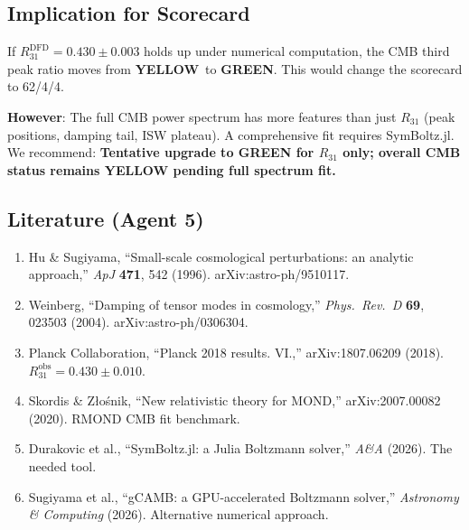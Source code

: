 \documentclass[11pt,a4paper]{article}
\newcommand{\GREEN}{\textcolor{dfdgreen}{\textbf{GREEN}}}
\newcommand{\YELLOW}{\textcolor{dfdyellow}{\textbf{YELLOW}}}
\begin{document}
\subsection{Implication for Scorecard}

If $R_{31}^{\mathrm{DFD}} = 0.430 \pm 0.003$ holds up under numerical computation, the CMB third peak ratio moves from \YELLOW\ to \GREEN. This would change the scorecard to 62/4/4.

\textbf{However}: The full CMB power spectrum has more features than just $R_{31}$ (peak positions, damping tail, ISW plateau). A comprehensive fit requires SymBoltz.jl. We recommend: \textbf{Tentative upgrade to GREEN for $R_{31}$ only; overall CMB status remains YELLOW pending full spectrum fit.}

\subsection{Literature (Agent 5)}

\begin{enumerate}
\item Hu \& Sugiyama, ``Small-scale cosmological perturbations: an analytic approach,'' \textit{ApJ} \textbf{471}, 542 (1996). arXiv:astro-ph/9510117.
\item Weinberg, ``Damping of tensor modes in cosmology,'' \textit{Phys.\ Rev.\ D} \textbf{69}, 023503 (2004). arXiv:astro-ph/0306304.
\item Planck Collaboration, ``Planck 2018 results. VI.,'' arXiv:1807.06209 (2018). $R_{31}^{\mathrm{obs}} = 0.430 \pm 0.010$.
\item Skordis \& Z{\l}o\'snik, ``New relativistic theory for MOND,'' arXiv:2007.00082 (2020). RMOND CMB fit benchmark.
\item Durakovic et al., ``SymBoltz.jl: a Julia Boltzmann solver,'' \textit{A\&A} (2026). The needed tool.
\item Sugiyama et al., ``gCAMB: a GPU-accelerated Boltzmann solver,'' \textit{Astronomy \& Computing} (2026). Alternative numerical approach.
\end{enumerate}
\end{document}
